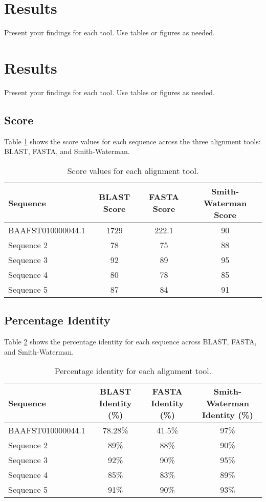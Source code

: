 \documentclass[a4paper,12pt]{article}
\begin{document}
\section{Results}
Present your findings for each tool. Use tables or figures as needed.

\section{Results}
Present your findings for each tool. Use tables or figures as needed.

\subsection{Score}
Table \ref{table:score} shows the score values for each sequence across the three alignment tools: BLAST, FASTA, and Smith-Waterman.

\begin{table}[h!]
\centering
\begin{tabular}{|l|c|c|c|}
    \hline
    \textbf{Sequence} & \textbf{BLAST Score} & \textbf{FASTA Score} & \textbf{Smith-Waterman Score} \\
    \hline
    
    BAAFST010000044.1 & 1729 & 222.1 & 90 \\
    Sequence 2 & 78 & 75 & 88 \\
    Sequence 3 & 92 & 89 & 95 \\
    Sequence 4 & 80 & 78 & 85 \\
    Sequence 5 & 87 & 84 & 91 \\
    \hline
\end{tabular}
\caption{Score values for each alignment tool.}
\label{table:score}
\end{table}

\subsection{Percentage Identity}
Table \ref{table:identity} shows the percentage identity for each sequence across BLAST, FASTA, and Smith-Waterman.

\begin{table}[h!]
\centering
\begin{tabular}{|l|c|c|c|}
    \hline
    \textbf{Sequence} & \textbf{BLAST Identity (\%)} & \textbf{FASTA Identity (\%)} & \textbf{Smith-Waterman Identity (\%)} \\
    \hline
    BAAFST010000044.1 & 78.28\% & 41.5\% & 97\% \\
    Sequence 2 & 89\% & 88\% & 90\% \\
    Sequence 3 & 92\% & 90\% & 95\% \\
    Sequence 4 & 85\% & 83\% & 89\% \\
    Sequence 5 & 91\% & 90\% & 93\% \\
    \hline
\end{tabular}
\caption{Percentage identity for each alignment tool.}
\label{table:identity}
\end{table}
\end{document}
